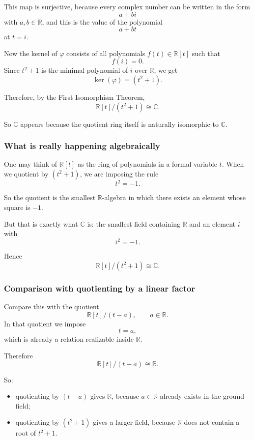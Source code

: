 \documentclass[12pt,a4paper]{article}
\theoremstyle{notespace}
\theoremstyle{definition}
\begin{document}
This map is surjective, because every complex number can be written in the form
\[
a+bi
\]
with \(a,b\in \mathbb{R}\), and this is the value of the polynomial
\[
a+bt
\]
at \(t=i\).

Now the kernel of \(\varphi\) consists of all polynomials \(f(t)\in \mathbb{R}[t]\) such that
\[
f(i)=0.
\]
Since \(t^2+1\) is the minimal polynomial of \(i\) over \(\mathbb{R}\), we get
\[
\ker(\varphi)=(t^2+1).
\]

Therefore, by the First Isomorphism Theorem,
\[
\mathbb{R}[t]/(t^2+1)\cong \mathbb{C}.
\]

So \(\mathbb{C}\) appears because the quotient ring itself is naturally isomorphic to \(\mathbb{C}\).

\subsubsection{What is really happening algebraically}

One may think of \(\mathbb{R}[t]\) as the ring of polynomials in a formal variable \(t\).  
When we quotient by \((t^2+1)\), we are imposing the rule
\[
t^2=-1.
\]

So the quotient is the smallest \(\mathbb{R}\)-algebra in which there exists an element whose square is \(-1\).

But that is exactly what \(\mathbb{C}\) is: the smallest field containing \(\mathbb{R}\) and an element \(i\) with
\[
i^2=-1.
\]

Hence
\[
\mathbb{R}[t]/(t^2+1)\cong \mathbb{C}.
\]

\subsubsection{Comparison with quotienting by a linear factor}

Compare this with the quotient
\[
\mathbb{R}[t]/(t-a),
\qquad a\in \mathbb{R}.
\]
In that quotient we impose
\[
t=a,
\]
which is already a relation realizable inside \(\mathbb{R}\).

Therefore
\[
\mathbb{R}[t]/(t-a)\cong \mathbb{R}.
\]

So:

\begin{itemize}
	\item quotienting by \((t-a)\) gives \(\mathbb{R}\), because \(a\in\mathbb{R}\) already exists in the ground field;
	\item quotienting by \((t^2+1)\) gives a larger field, because \(\mathbb{R}\) does not contain a root of \(t^2+1\).
\end{itemize}
\end{document}
